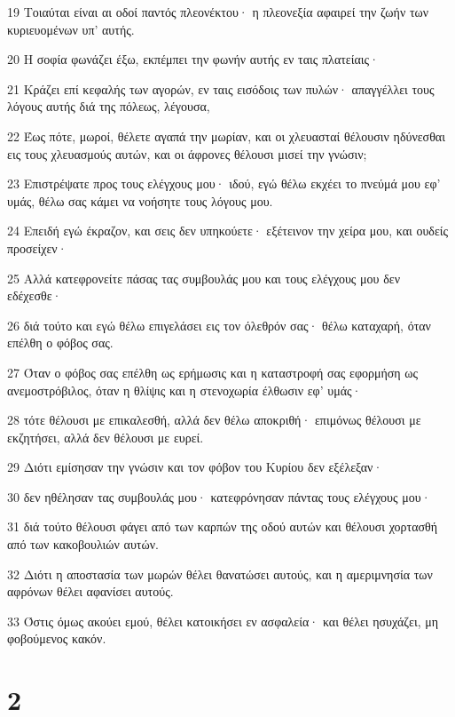 \par 19 Τοιαύται είναι αι οδοί παντός πλεονέκτου· η πλεονεξία αφαιρεί την ζωήν των κυριευομένων υπ' αυτής.
\par 20 Η σοφία φωνάζει έξω, εκπέμπει την φωνήν αυτής εν ταις πλατείαις·
\par 21 Κράζει επί κεφαλής των αγορών, εν ταις εισόδοις των πυλών· απαγγέλλει τους λόγους αυτής διά της πόλεως, λέγουσα,
\par 22 Έως πότε, μωροί, θέλετε αγαπά την μωρίαν, και οι χλευασταί θέλουσιν ηδύνεσθαι εις τους χλευασμούς αυτών, και οι άφρονες θέλουσι μισεί την γνώσιν;
\par 23 Επιστρέψατε προς τους ελέγχους μου· ιδού, εγώ θέλω εκχέει το πνεύμά μου εφ' υμάς, θέλω σας κάμει να νοήσητε τους λόγους μου.
\par 24 Επειδή εγώ έκραζον, και σεις δεν υπηκούετε· εξέτεινον την χείρα μου, και ουδείς προσείχεν·
\par 25 Αλλά κατεφρονείτε πάσας τας συμβουλάς μου και τους ελέγχους μου δεν εδέχεσθε·
\par 26 διά τούτο και εγώ θέλω επιγελάσει εις τον όλεθρόν σας· θέλω καταχαρή, όταν επέλθη ο φόβος σας.
\par 27 Όταν ο φόβος σας επέλθη ως ερήμωσις και η καταστροφή σας εφορμήση ως ανεμοστρόβιλος, όταν η θλίψις και η στενοχωρία έλθωσιν εφ' υμάς·
\par 28 τότε θέλουσι με επικαλεσθή, αλλά δεν θέλω αποκριθή· επιμόνως θέλουσι με εκζητήσει, αλλά δεν θέλουσι με ευρεί.
\par 29 Διότι εμίσησαν την γνώσιν και τον φόβον του Κυρίου δεν εξέλεξαν·
\par 30 δεν ηθέλησαν τας συμβουλάς μου· κατεφρόνησαν πάντας τους ελέγχους μου·
\par 31 διά τούτο θέλουσι φάγει από των καρπών της οδού αυτών και θέλουσι χορτασθή από των κακοβουλιών αυτών.
\par 32 Διότι η αποστασία των μωρών θέλει θανατώσει αυτούς, και η αμεριμνησία των αφρόνων θέλει αφανίσει αυτούς.
\par 33 Όστις όμως ακούει εμού, θέλει κατοικήσει εν ασφαλεία· και θέλει ησυχάζει, μη φοβούμενος κακόν.

\chapter{2}

